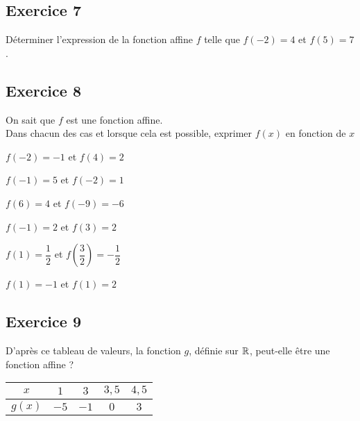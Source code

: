 \documentclass[12pt,a4paper]{article}
\begin{document}
\subsection*{Exercice 7}
Déterminer l'expression de la fonction affine $f$ telle que $f(-2)=4$ et $f(5)=7$.

\subsection*{Exercice 8}

On sait que $f$ est une fonction affine.\\
Dans chacun des cas et lorsque cela est possible, exprimer $f(x)$ en fonction de $x$

\begin{enumerate}
\begin{minipage}[c]{0.4\linewidth}
\item $f(-2)=-1$ et $f(4)=2$
\item $f(-1)=5$ et $f(-2)=1$
\end{minipage}
\begin{minipage}[c]{0.4\linewidth}
\item $f(6)=4$ et $f(-9)=-6$
\item $f(-1)=2$ et $f(3)=2$
\end{minipage}
\begin{minipage}[c]{0.4\linewidth}
\item $f(1)=\dfrac{1}{2}$ et $f\left(\dfrac{3}{2}\right)=-\dfrac{1}{2}$
\item $f(1)=-1$ et $f(1)=2$
\end{minipage}
\end{enumerate}

\subsection*{Exercice 9}

D'après ce tableau de valeurs, la fonction $g$, définie sur $\mathbb{R}$, peut-elle être une fonction affine ?

\begin{center}
 { \setlength{\tabcolsep}{9mm}
\begin{tabular}{|c|c|c|c|c|} \hline
$x$ & $1$&$3$& $3,5$&$4,5$ \\ \hline
$g(x)$ &$-5$ & $-1$&$0$&$3$  \\ \hline
\end{tabular} }
   
\end{center}
\end{document}
